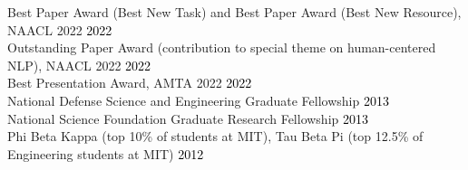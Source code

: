 {}

Best Paper Award (Best New Task) and Best Paper Award (Best New Resource), NAACL 2022 \hfill \textcolor{black}{2022}\\ %
Outstanding Paper Award (contribution to special theme on human-centered NLP), NAACL 2022 \hfill \textcolor{black}{2022}\\ %
Best Presentation Award, AMTA 2022 \hfill \textcolor{black}{2022}\\ %
National Defense Science and Engineering Graduate Fellowship \hfill \textcolor{black}{2013}\\ %
National Science Foundation Graduate Research Fellowship \hfill \textcolor{black}{2013}\\ %
Phi Beta Kappa (top 10\% of students at MIT), Tau Beta Pi (top 12.5\% of Engineering students at MIT) \hfill \textcolor{black}{2012}\\
